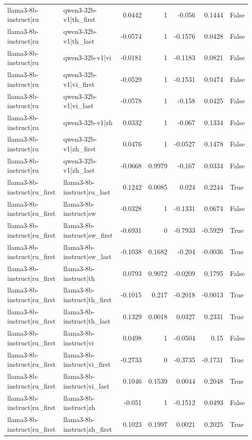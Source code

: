 \begin{table}
\begin{tabular}{l l r r r r l}
llama3-8b-instruct|ru & qwen3-32b-v1|th_first & 0.0442 & 1 & -0.056 & 0.1444 & False \\
llama3-8b-instruct|ru & qwen3-32b-v1|th_last & -0.0574 & 1 & -0.1576 & 0.0428 & False \\
llama3-8b-instruct|ru & qwen3-32b-v1|vi & -0.0181 & 1 & -0.1183 & 0.0821 & False \\
llama3-8b-instruct|ru & qwen3-32b-v1|vi_first & -0.0529 & 1 & -0.1531 & 0.0474 & False \\
llama3-8b-instruct|ru & qwen3-32b-v1|vi_last & -0.0578 & 1 & -0.158 & 0.0425 & False \\
llama3-8b-instruct|ru & qwen3-32b-v1|zh & 0.0332 & 1 & -0.067 & 0.1334 & False \\
llama3-8b-instruct|ru & qwen3-32b-v1|zh_first & 0.0476 & 1 & -0.0527 & 0.1478 & False \\
llama3-8b-instruct|ru & qwen3-32b-v1|zh_last & -0.0668 & 0.9979 & -0.167 & 0.0334 & False \\
llama3-8b-instruct|ru_first & llama3-8b-instruct|ru_last & 0.1242 & 0.0085 & 0.024 & 0.2244 & True \\
llama3-8b-instruct|ru_first & llama3-8b-instruct|sw & -0.0328 & 1 & -0.1331 & 0.0674 & False \\
llama3-8b-instruct|ru_first & llama3-8b-instruct|sw_first & -0.6931 & 0 & -0.7933 & -0.5929 & True \\
llama3-8b-instruct|ru_first & llama3-8b-instruct|sw_last & -0.1038 & 0.1682 & -0.204 & -0.0036 & True \\
llama3-8b-instruct|ru_first & llama3-8b-instruct|th & 0.0793 & 0.9072 & -0.0209 & 0.1795 & False \\
llama3-8b-instruct|ru_first & llama3-8b-instruct|th_first & -0.1015 & 0.217 & -0.2018 & -0.0013 & True \\
llama3-8b-instruct|ru_first & llama3-8b-instruct|th_last & 0.1329 & 0.0018 & 0.0327 & 0.2331 & True \\
llama3-8b-instruct|ru_first & llama3-8b-instruct|vi & 0.0498 & 1 & -0.0504 & 0.15 & False \\
llama3-8b-instruct|ru_first & llama3-8b-instruct|vi_first & -0.2733 & 0 & -0.3735 & -0.1731 & True \\
llama3-8b-instruct|ru_first & llama3-8b-instruct|vi_last & 0.1046 & 0.1539 & 0.0044 & 0.2048 & True \\
llama3-8b-instruct|ru_first & llama3-8b-instruct|zh & -0.051 & 1 & -0.1512 & 0.0493 & False \\
llama3-8b-instruct|ru_first & llama3-8b-instruct|zh_first & 0.1023 & 0.1997 & 0.0021 & 0.2025 & True \\

\end{tabular}
\end{table}
